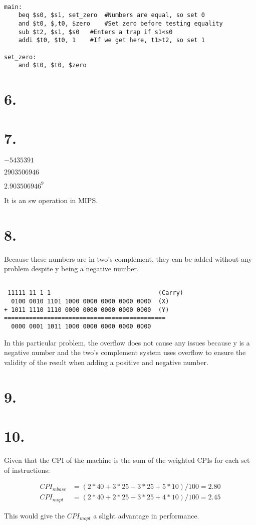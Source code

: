\documentclass[12pt]{article}
\begin{document}
\begin{lstlisting}

main:
	beq $s0, $s1, set_zero	#Numbers are equal, so set 0
	and $t0, $,t0, $zero    #Set zero before testing equality
	sub $t2, $s1, $s0	#Enters a trap if s1<s0
	addi $t0, $t0, 1 	#If we get here, t1>t2, so set 1

set_zero:
	and $t0, $t0, $zero

\end{lstlisting}



\section*{6.}

\section*{7.}

 $-5435391$

 $2903506946$

 $2.903506946^9$

 It is an sw operation in MIPS.

\section*{8.}

Because these numbers are in two's complement, they can be added without any problem despite y being a negative number.

\begin{verbatim}

 11111 11 1 1                              (Carry)
  0100 0010 1101 1000 0000 0000 0000 0000  (X)
+ 1011 1110 1110 0000 0000 0000 0000 0000  (Y)
=============================================
  0000 0001 1011 1000 0000 0000 0000 0000
\end{verbatim}

In this particular problem, the overflow does not cause any issues because y is a negative number and the two's complement system uses overflow to ensure the validity of the result when adding a positive and negative number.

\section*{9.}



\section*{10.}

Given that the CPI of the machine is the sum of the weighted CPIs for each set of instructions:

\begin{align*}
	CPI_{mbase} &= (2 * 40 + 3 * 25 + 3 * 25 + 5 * 10) / 100 = 2.80 \\
	CPI_{mopt} &= (2 * 40 + 2 * 25 + 3 * 25 + 4 * 10) / 100 = 2.45
\end{align*}

This would give the $CPI_{mopt}$ a slight advantage in performance.
\end{document}
